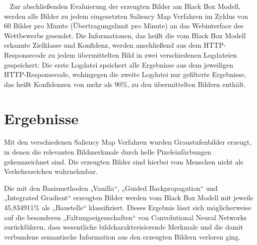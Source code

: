 ~\newline
Zur abschließenden Evaluierung der erzeugten Bilder am Black Box Modell, werden alle Bilder zu jedem eingesetzten Saliency Map Verfahren im Zyklus von 60 Bilder pro Minute (Übertragungslimit pro Minute) an das Webinterface des Wettbewerbs gesendet. Die Informationen, das heißt die vom Black Box Modell erkannte Zielklasse und Konfidenz, werden anschließend aus dem HTTP-Responsecode zu jedem übermittelten Bild in zwei verschiedenen Logdateien gespeichert: Die erste Logdatei speichert alle Ergebnisse aus dem jeweiligen HTTP-Responsecode, wohingegen die zweite Logdatei nur gefilterte Ergebnisse, das heißt Konfidenzen von mehr als 90\%, zu den übermittelten Bildern enthält.


%
%
%
%
%

\section{Ergebnisse}
\label{sec:SalErgebnisse}
Mit den verschiedenen Saliency Map Verfahren wurden Graustufenbilder erzeugt, in denen die relevanten Bildmerkmale durch helle Pixeleinfärbungen gekennzeichnet sind. 
Die erzeugten Bilder sind hierbei vom Menschen nicht als Verkehrszeichen wahrnehmbar.

Die mit den Basismethoden „Vanilla“, „Guided Backpropagation“ und „Integrated Gradient“ erzeugten Bilder werden vom Black Box Modell mit jeweils 45,834911\% als „Baustelle“ klassifiziert.
Dieses Ergebnis lässt sich möglicherweise auf die besonderen „Faltungseigenschaften“ von Convolutional Neural Networks zurückführen, dass wesentliche bildcharakterisierende Merkmale und die damit verbundene semantische Information aus den erzeugten Bildern verloren ging.

